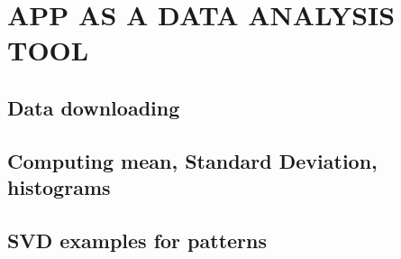 \chapter{APP AS A DATA ANALYSIS TOOL}
\label{chap:conclusion}

\section{Data downloading}

\section{Computing mean, Standard Deviation, histograms}

\section{SVD examples for patterns}


